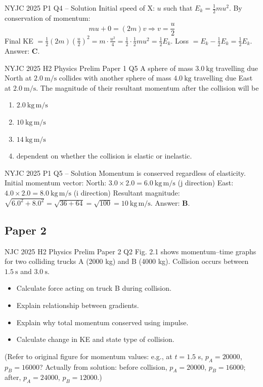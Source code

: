 \documentclass[11pt]{beamer}
\begin{document}
\begin{frame}{NYJC 2025 P1 Q4 – Solution}
Initial speed of X: $u$ such that $E_k = \frac12 m u^2$. By conservation of momentum:
\[ m u + 0 = (2m) v \Rightarrow v = \frac{u}{2} \]
Final KE $= \frac12 (2m) \left(\frac{u}{2}\right)^2 = m \cdot \frac{u^2}{4} = \frac12 \cdot \frac12 m u^2 = \frac12 E_k$.
Loss $= E_k - \frac12 E_k = \frac12 E_k$.
Answer: \textbf{C}.
\end{frame}

\begin{frame}[shrink=15]{NYJC 2025 H2 Physics Prelim Paper 1 Q5}
A sphere of mass $3.0\ \mathrm{kg}$ travelling due North at $2.0\ \mathrm{m/s}$ collides with another sphere of mass $4.0\ \mathrm{kg}$ travelling due East at $2.0\ \mathrm{m/s}$. The magnitude of their resultant momentum after the collision will be
\begin{enumerate}[A]
    \item $2.0\ \mathrm{kg\,m/s}$
    \item $10\ \mathrm{kg\,m/s}$
    \item $14\ \mathrm{kg\,m/s}$
    \item dependent on whether the collision is elastic or inelastic.
\end{enumerate}
\end{frame}

\begin{frame}{NYJC 2025 P1 Q5 – Solution}
Momentum is conserved regardless of elasticity. Initial momentum vector:
North: $3.0\times2.0 = 6.0\ \mathrm{kg\,m/s}$ (j direction)
East: $4.0\times2.0 = 8.0\ \mathrm{kg\,m/s}$ (i direction)
Resultant magnitude: $\sqrt{6.0^2 + 8.0^2} = \sqrt{36 + 64} = \sqrt{100} = 10\ \mathrm{kg\,m/s}$.
Answer: \textbf{B}.
\end{frame}

\subsection{Paper 2}

\begin{frame}[shrink=15]{NJC 2025 H2 Physics Prelim Paper 2 Q2}
Fig. 2.1 shows momentum–time graphs for two colliding trucks A (2000 kg) and B (4000 kg). Collision occurs between $1.5\ \mathrm{s}$ and $3.0\ \mathrm{s}$.
\begin{itemize}
    \item[(b)(i)] Calculate force acting on truck B during collision.
    \item[(b)(ii)] Explain relationship between gradients.
    \item[(b)(iii)] Explain why total momentum conserved using impulse.
    \item[(b)(iv)] Calculate change in KE and state type of collision.
\end{itemize}
(Refer to original figure for momentum values: e.g., at $t=1.5$ s, $p_A = 20000$, $p_B = 16000$? Actually from solution: before collision, $p_A = 20000$, $p_B = 16000$; after, $p_A = 24000$, $p_B = 12000$.)
\end{frame}
\end{document}

